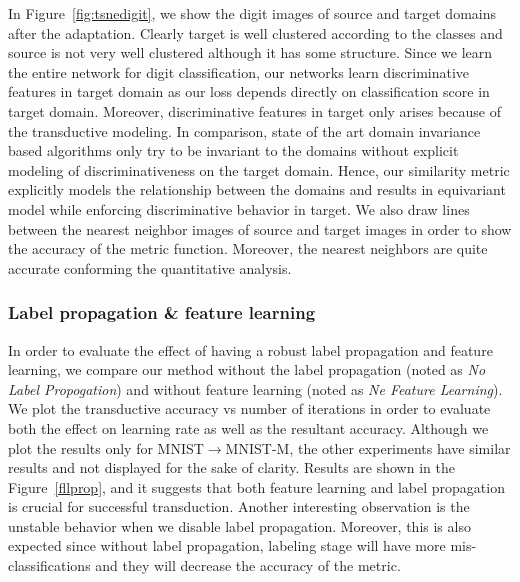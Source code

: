 In Figure~\ref{fig:tsnedigit}, we show the digit images of source and target domains after the adaptation. Clearly target is well clustered according to the classes and source is not very well clustered although it has some structure. Since we learn the entire network for digit classification, our networks learn discriminative features in target domain as our loss depends directly on classification score in target domain. Moreover, discriminative features in target only arises because of the transductive modeling. In comparison, state of the art domain invariance based algorithms only try to be invariant to the domains without explicit modeling of discriminativeness on the target domain. Hence, our similarity metric explicitly models the relationship between the domains and results in equivariant model while enforcing discriminative behavior in target. We also draw lines between the nearest neighbor images of source and target images in order to show the accuracy of the metric function. Moreover, the nearest neighbors are quite accurate conforming the quantitative analysis. 

\subsubsection{Label propagation \& feature learning}
In order to evaluate the effect of having a robust label propagation and feature learning, we compare our method without the label propagation (noted as \emph{No Label Propogation}) and without feature learning (noted as \emph{Ne Feature Learning}). We plot the transductive accuracy vs number of iterations in order to evaluate both the effect on learning rate as well as the resultant accuracy. Although we plot the results only for MNIST$\rightarrow$MNIST-M, the other experiments have similar results and not displayed for the sake of clarity.  Results are shown in the Figure~\ref{fllprop}, and it suggests that both feature learning and label propagation is crucial for successful transduction. Another interesting observation is the unstable behavior when we disable label propagation. Moreover, this is also expected since without label propagation, labeling stage will have more mis-classifications and they will decrease the accuracy of the metric.

